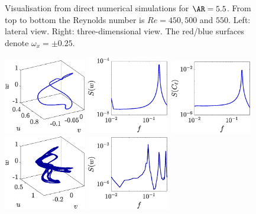 \begin{figure}
  \caption{Visualisation from direct numerical simulations for $\AR=5.5$. From top to bottom the Reynolds number is $Re=450,500$ and $550$. Left: lateral view. Right: three-dimensional view. The red/blue surfaces denote $\omega_x = \pm 0.25$.}
  \label{fig:viewdns-ar5p5}       
\end{figure}

\begin{figure}
  \centering
  \includegraphics[width=0.32\textwidth]{./fig/AR5p5/u-v-w_Re450.eps}
  \includegraphics[width=0.32\textwidth]{./fig/AR5p5/w_f_Re450.eps} 
  \includegraphics[width=0.32\textwidth]{./fig/AR5p5/cl_f_Re450.eps}
  \includegraphics[width=0.32\textwidth]{./fig/AR5p5/u-v-w_Re500.eps}
  \includegraphics[width=0.32\textwidth]{./fig/AR5p5/w_f_Re500.eps} 

\end{figure}
